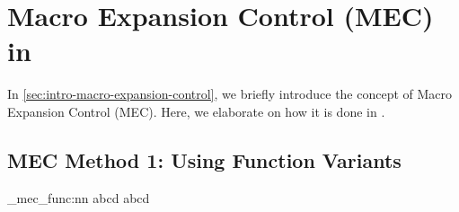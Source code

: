 \documentclass{ltugboat}
\begin{document}
\section{Macro Expansion Control (MEC) in \LTT{}}\label{sec:macro-expansion-control}
In \cref{sec:intro-macro-expansion-control}, we briefly introduce the concept of Macro Expansion Control (MEC).
Here, we elaborate on how it is done in \LTT{}.




\subsection{MEC Method 1: Using Function Variants}

\begin{latexsample}[examplelabel={ex:mec-use-variant},exampletitle={Using the Correct Function Variant}]
  \ExplSyntaxOn
  \def\somecmd{abcd}
  \my_mec_func:nn {abcd} {\somecmd}
  \ExplSyntaxOff
\end{latexsample}





\makesignature
\end{document}
